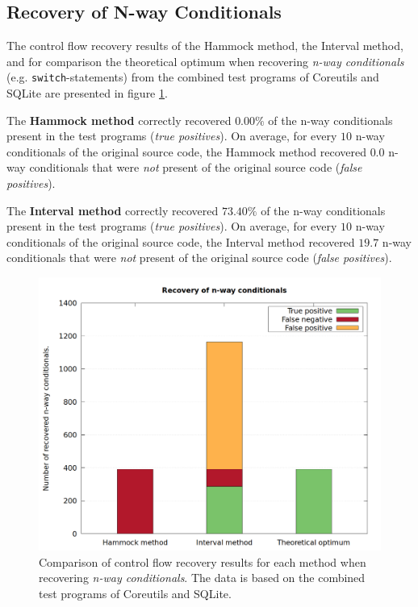 
\subsection{Recovery of N-way Conditionals}
\label{sec:recovery_of_nway_conditionals}

The control flow recovery results of the Hammock method, the Interval method, and for comparison the theoretical optimum when recovering \textit{n-way conditionals} (e.g. \texttt{switch}-statements) from the combined test programs of Coreutils and SQLite are presented in figure \ref{fig:total_results_nway}.

The \textbf{Hammock method} correctly recovered $0.00\%$ of the n-way conditionals present in the test programs (\textit{true positives}). On average, for every $10$ n-way conditionals of the original source code, the Hammock method recovered $0.0$ n-way conditionals that were \textit{not} present of the original source code (\textit{false positives}).

The \textbf{Interval method} correctly recovered $73.40\%$ of the n-way conditionals present in the test programs (\textit{true positives}). On average, for every $10$ n-way conditionals of the original source code, the Interval method recovered $19.7$ n-way conditionals that were \textit{not} present of the original source code (\textit{false positives}).

\begin{figure}[htbp]
	\centering
	\includegraphics[width=\textwidth]{inc/5_results/results_n-way.png}
	\caption{Comparison of control flow recovery results for each method when recovering \textit{n-way conditionals}. The data is based on the combined test programs of Coreutils and SQLite.}
	\label{fig:total_results_nway}
\end{figure}
